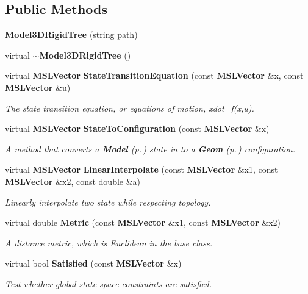 \subsection*{Public Methods}
\begin{CompactItemize}
\item 
{\bf Model3DRigid\-Tree} (string path)
\item 
virtual {\bf $\sim$Model3DRigid\-Tree} ()
\item 
virtual {\bf MSLVector} {\bf State\-Transition\-Equation} (const {\bf MSLVector} \&x, const {\bf MSLVector} \&u)
\begin{CompactList}\small\item\em The state transition equation, or equations of motion, xdot=f(x,u).\item\end{CompactList}\item 
virtual {\bf MSLVector} {\bf State\-To\-Configuration} (const {\bf MSLVector} \&x)
\begin{CompactList}\small\item\em A method that converts a {\bf Model} {\rm (p.\,\pageref{class_Model})} state in to a {\bf Geom} {\rm (p.\,\pageref{class_Geom})} configuration.\item\end{CompactList}\item 
virtual {\bf MSLVector} {\bf Linear\-Interpolate} (const {\bf MSLVector} \&x1, const {\bf MSLVector} \&x2, const double \&a)
\begin{CompactList}\small\item\em Linearly interpolate two state while respecting topology.\item\end{CompactList}\item 
virtual double {\bf Metric} (const {\bf MSLVector} \&x1, const {\bf MSLVector} \&x2)
\begin{CompactList}\small\item\em A distance metric, which is Euclidean in the base class.\item\end{CompactList}\item 
virtual bool {\bf Satisfied} (const {\bf MSLVector} \&x)
\begin{CompactList}\small\item\em Test whether global state-space constraints are satisfied.\item\end{CompactList}\end{CompactItemize}
